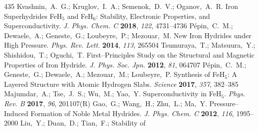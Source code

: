 \documentclass[12pt,letterpaper,oneside]{article}
\begin{document}
\begin{mcitethebibliography}{435}
Kvashnin,~A.~G.; Kruglov,~I.~A.; Semenok,~D.~V.; Oganov,~A.~R. Iron
  Superhydrides FeH$_5$ and FeH$_6$: Stability, Electronic Properties, and
  Superconductivity. \emph{J. Phys. Chem. C} \textbf{2018}, \emph{122},
  4731--4736\relax
\mciteBstWouldAddEndPuncttrue
\mciteSetBstMidEndSepPunct{\mcitedefaultmidpunct}
{\mcitedefaultendpunct}{\mcitedefaultseppunct}\relax
\EndOfBibitem
{}
P\'epin,~C.~M.; Dewaele,~A.; Geneste,~G.; Loubeyre,~P.; Mezouar,~M. New Iron
  Hydrides under High Pressure. \emph{Phys. Rev. Lett.} \textbf{2014},
  \emph{113}, 265504\relax
\mciteBstWouldAddEndPuncttrue
\mciteSetBstMidEndSepPunct{\mcitedefaultmidpunct}
{\mcitedefaultendpunct}{\mcitedefaultseppunct}\relax
\EndOfBibitem
{}
Tsumuraya,~T.; Matsuura,~Y.; Shishidou,~T.; Oguchi,~T. First--Principles Study
  on the Structural and Magnetic Properties of Iron Hydride. \emph{J. Phys.
  Soc. Jpn.} \textbf{2012}, \emph{81}, 064707\relax
\mciteBstWouldAddEndPuncttrue
\mciteSetBstMidEndSepPunct{\mcitedefaultmidpunct}
{\mcitedefaultendpunct}{\mcitedefaultseppunct}\relax
\EndOfBibitem
{}
P\'epin,~C.~M.; Geneste,~G.; Dewaele,~A.; Mezouar,~M.; Loubeyre,~P. Synthesis
  of FeH$_5$: A Layered Structure with Atomic Hydrogen Slabs. \emph{Science}
  \textbf{2017}, \emph{357}, 382--385\relax
\mciteBstWouldAddEndPuncttrue
\mciteSetBstMidEndSepPunct{\mcitedefaultmidpunct}
{\mcitedefaultendpunct}{\mcitedefaultseppunct}\relax
\EndOfBibitem
{}
Majumdar,~A.; Tse,~J.~S.; Wu,~M.; Yao,~Y. Superconductivity in FeH$_5$.
  \emph{Phys. Rev. B} \textbf{2017}, \emph{96}, 201107(R)\relax
\mciteBstWouldAddEndPuncttrue
\mciteSetBstMidEndSepPunct{\mcitedefaultmidpunct}
{\mcitedefaultendpunct}{\mcitedefaultseppunct}\relax
\EndOfBibitem
{}
Gao,~G.; Wang,~H.; Zhu,~L.; Ma,~Y. Pressure--Induced Formation of Noble Metal
  Hydrides. \emph{J. Phys. Chem. C} \textbf{2012}, \emph{116}, 1995--2000\relax
\mciteBstWouldAddEndPuncttrue
\mciteSetBstMidEndSepPunct{\mcitedefaultmidpunct}
{\mcitedefaultendpunct}{\mcitedefaultseppunct}\relax
\EndOfBibitem
{}
Liu,~Y.; Duan,~D.; Tian,~F.;   Stability of

\end{mcitethebibliography}
\end{document}
